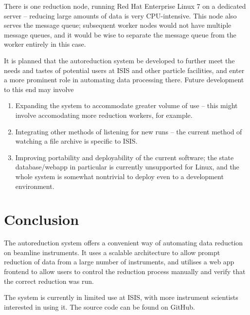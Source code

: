 \documentclass[twocolumn]{article}
\begin{document}
There is one reduction node, running Red Hat Enterprise Linux 7\cite{rhel}
on a dedicated server -- reducing large amounts of data is very CPU-intensive.
This node also serves the message queue; subsequent worker nodes would
not have multiple message queues, and it would be wise to separate the
message queue from the worker entirely in this case.

It is planned that the autoreduction system be developed to further meet
the needs and tastes of potential users at ISIS and other particle
facilities, and enter a more prominent role in automating data
processing there. Future development to this end may involve

\begin{enumerate}
\item
  Expanding the system to accommodate greater volume of use -- this
  might involve accomodating more reduction workers, for example.
\item
  Integrating other methods of listening for new runs -- the current
  method of watching a file archive is specific to ISIS.
\item
  Improving portability and deployability of the current software; the
  state database/webapp in particular is currently unsupported for
  Linux, and the whole system is somewhat nontrivial to deploy even to a
  development environment.
\end{enumerate}

\section{Conclusion}\label{conclusion}

The autoreduction system offers a convenient way of automating data reduction
on beamline instruments. It uses a scalable architecture to allow prompt
reduction of data from a large number of instruments, and utilises a web app
frontend to allow users to control the reduction process manually and verify
that the correct reduction was run.

The system is currently in limited use at ISIS, with more instrument scientists
interested in using it. The source code can be found on GitHub\cite{source}.
\end{document}
